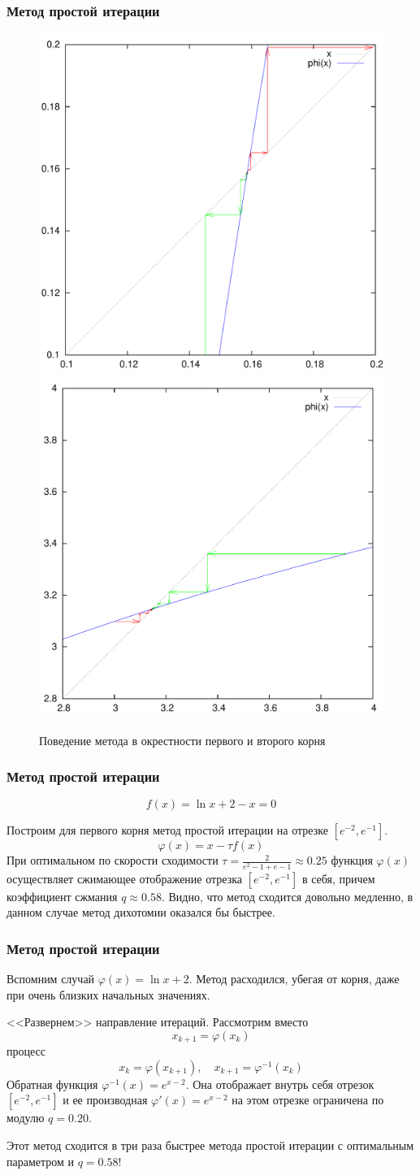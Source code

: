 \documentclass[apectratio=43,unicode]{beamer}
\begin{document}
\begin{frame}
\frametitle{Метод простой итерации}
	\begin{figure}%
	\includegraphics[width=0.5\columnwidth]{si2.pdf}%
	\includegraphics[width=0.5\columnwidth]{si.pdf}%
	\caption[]{Поведение метода в окрестности первого и второго корня}
	\end{figure}
\end{frame}

\begin{frame}
\frametitle{Метод простой итерации}
	\[f(x) = \ln x + 2 - x = 0\]

	Построим для первого корня метод простой итерации на отрезке $[e^{-2}, e^{-1}]$.
	\[
	\varphi(x) = x - \tau f(x)
	\]
	При оптимальном по скорости сходимости
	$\tau = \frac{2}{e^2-1 + e-1} \approx 0.25$
	функция $\varphi(x)$ осуществляет сжимающее отображение отрезка $[e^{-2},e^{-1}]$ в себя, причем коэффициент сжмания $q \approx 0.58$.
	Видно, что метод сходится довольно медленно, в данном случае метод дихотомии оказался бы быстрее.
\end{frame}

\begin{frame}
\frametitle{Метод простой итерации}
	Вспомним случай $\varphi(x) = \ln x + 2$. Метод расходился, убегая от корня, даже при очень близких начальных значениях.
	\pause

	<<Развернем>> направление итераций. Рассмотрим вместо
	\[
	x_{k+1} = \varphi(x_k)
	\]
	процесс
	\[
	x_{k} = \varphi(x_{k+1}), \quad x_{k+1} = \varphi^{-1}(x_k)
	\]
	Обратная функция $\varphi^{-1}(x) = e^{x-2}$.
	Она отображает внутрь себя отрезок $[e^{-2}, e^{-1}]$ и ее производная $\varphi'(x) = e^{x-2}$ на этом отрезке ограничена по модулю $q = 0.20$.

	Этот метод сходится в три раза быстрее метода простой итерации с оптимальным параметром и $q = 0.58$!
\end{frame}
\end{document}
